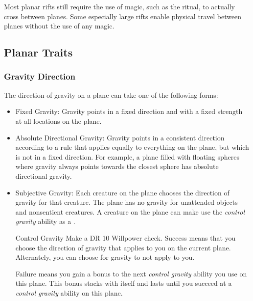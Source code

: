         Most planar rifts still require the use of magic, such as the  ritual, to actually cross between planes.
        Some especially large rifts enable physical travel between planes without the use of any magic.

    \subsection{Planar Traits}
        \subsubsection{Gravity Direction}
            The direction of gravity on a plane can take one of the following forms:
            \begin{itemize}
                \item Fixed Gravity: Gravity points in a fixed direction and with a fixed strength at all locations on the plane.
                \item Absolute Directional Gravity: Gravity points in a consistent direction according to a rule that applies equally to everything on the plane, but which is not in a fixed direction.
                    For example, a plane filled with floating spheres where gravity always points towards the closest sphere has absolute directional gravity.
                \item Subjective Gravity: Each creature on the plane chooses the direction of gravity for that creature.
                    The plane has no gravity for unattended objects and nonsentient creatures.
                    A creature on the plane can make use the \textit{control gravity} ability as a .
                    \begin{freeability}{Control Gravity}
                        Make a DR 10 Willpower check.
                        Success means that you choose the direction of gravity that applies to you on the current plane.
                        Alternately, you can choose for gravity to not apply to you.

                        Failure means you gain a  bonus to the next \textit{control gravity} ability you use on this plane.
                        This bonus stacks with itself and lasts until you succeed at a \textit{control gravity} ability on this plane.
                    \end{freeability}
            \end{itemize}


